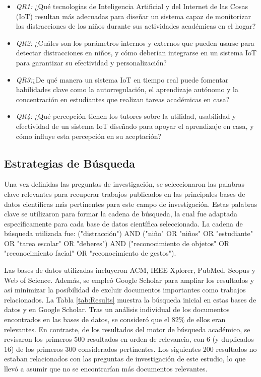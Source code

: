 \documentclass[a4paper,fleqn]{cas-sc}
\begin{document}
			\begin{itemize}
				\item \textit{QR1:} ¿Qué tecnologías de Inteligencia Artificial y del Internet de las Cosas (IoT) resultan más adecuadas para diseñar un sistema capaz de monitorizar las distracciones de los niños durante sus actividades académicas en el hogar?
				\item \textit{QR2:} ¿Cuáles son los parámetros internos y externos que pueden usarse para detectar distracciones en niños, y cómo deberían integrarse en un sistema IoT para garantizar su efectividad y personalización?
				\item  \textit{QR3:}¿De qué manera un sistema IoT en tiempo real puede fomentar habilidades clave como la autorregulación, el aprendizaje autónomo y la concentración en estudiantes que realizan tareas académicas en casa?
				\item \textit{QR4:} ¿Qué percepción tienen los tutores sobre la utilidad, usabilidad y efectividad de un sistema IoT diseñado para apoyar el aprendizaje en casa, y cómo influye esta percepción en su aceptación?
			\end{itemize}
		
		\subsection{Estrategias de Búsqueda}
			Una vez definidas las preguntas de investigación, se seleccionaron las palabras clave relevantes para recuperar trabajos publicados en las principales bases de datos científicas más pertinentes para este campo de investigación. Estas palabras clave se utilizaron para formar la cadena de búsqueda, la cual fue adaptada específicamente para cada base de datos científica seleccionada. La cadena de búsqueda utilizada fue: ("distracción") AND ("niño" OR "niños" OR "estudiante" OR "tarea escolar" OR "deberes") AND ("reconocimiento de objetos" OR "reconocimiento facial" OR "reconocimiento de gestos").
			
			Las bases de datos utilizadas incluyeron ACM, IEEE Xplorer, PubMed, Scopus y Web of Science. Además, se empleó Google Scholar para ampliar los resultados y así minimizar la posibilidad de excluir documentos importantes como trabajos relacionados. La Tabla \ref{tab:Results} muestra la búsqueda inicial en estas bases de datos y en Google Scholar. Tras un análisis individual de los documentos encontrados en las bases de datos, se consideró que el 82\% de ellos eran relevantes. En contraste, de los resultados del motor de búsqueda académico, se revisaron los primeros 500 resultados en orden de relevancia, con 6 (y duplicados 16) de los primeros 300 considerados pertinentes. Los siguientes 200 resultados no estaban relacionados con las preguntas de investigación de este estudio, lo que llevó a asumir que no se encontrarían más documentos relevantes.
			
\end{document}
